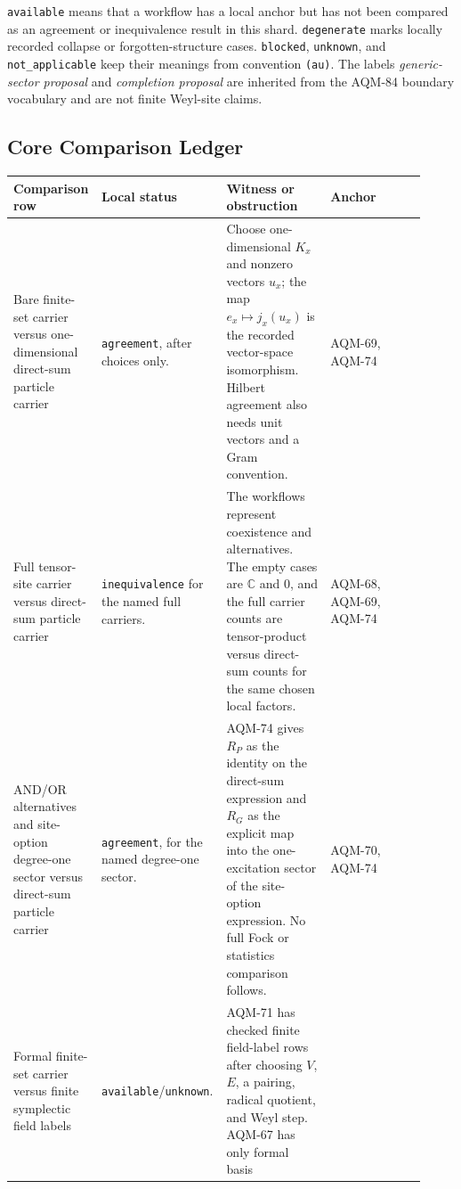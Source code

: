 \texttt{available} means that a workflow has a local anchor but has not been
compared as an agreement or inequivalence result in this shard.
\texttt{degenerate} marks locally recorded collapse or forgotten-structure
cases.  \texttt{blocked}, \texttt{unknown}, and \texttt{not\_applicable} keep
their meanings from convention \texttt{(au)}.  The labels
\emph{generic-sector proposal} and \emph{completion proposal} are inherited
from the AQM-84 boundary vocabulary and are not finite Weyl-site claims.

\subsection{Core Comparison Ledger}

\begin{center}
\scriptsize\setlength{\tabcolsep}{3pt}
\begin{tabular}{p{0.18\linewidth}p{0.26\linewidth}p{0.25\linewidth}p{0.23\linewidth}}
\toprule
Comparison row & Local status & Witness or obstruction & Anchor \\
\midrule
Bare finite-set carrier versus one-dimensional direct-sum particle carrier &
\texttt{agreement}, after choices only. &
Choose one-dimensional \(K_x\) and nonzero vectors \(u_x\); the map
\(e_x\mapsto j_x(u_x)\) is the recorded vector-space isomorphism.  Hilbert
agreement also needs unit vectors and a Gram convention. &
AQM-69, AQM-74 \\
\addlinespace
Full tensor-site carrier versus direct-sum particle carrier &
\texttt{inequivalence} for the named full carriers. &
The workflows represent coexistence and alternatives.  The empty cases are
\(\mathbb C\) and \(0\), and the full carrier counts are tensor-product
versus direct-sum counts for the same chosen local factors. &
AQM-68, AQM-69, AQM-74 \\
\addlinespace
AND/OR alternatives and site-option degree-one sector versus direct-sum
particle carrier &
\texttt{agreement}, for the named degree-one sector. &
AQM-74 gives \(R_P\) as the identity on the direct-sum expression and \(R_G\)
as the explicit map into the one-excitation sector of the site-option
expression.  No full Fock or statistics comparison follows. &
AQM-70, AQM-74 \\
\addlinespace
Formal finite-set carrier versus finite symplectic field labels &
\texttt{available}/\texttt{unknown}. &
AQM-71 has checked finite field-label rows after choosing \(V\), \(E\), a
pairing, radical quotient, and Weyl step.  AQM-67 has only formal basis

\end{tabular}
\end{center}
